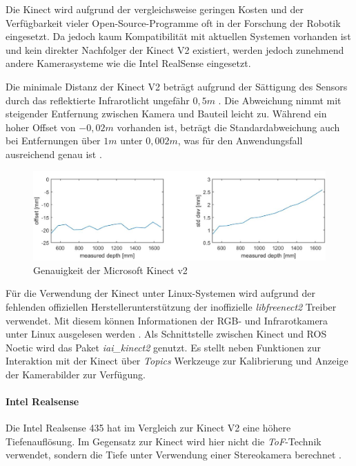 Die Kinect wird aufgrund der vergleichsweise geringen Kosten und der Verfügbarkeit vieler Open-Source-Programme oft in der Forschung der Robotik eingesetzt. Da jedoch kaum Kompatibilität mit aktuellen Systemen vorhanden ist und kein direkter Nachfolger der Kinect V2 existiert, werden jedoch zunehmend andere Kamerasysteme wie die Intel RealSense eingesetzt.

Die minimale Distanz der Kinect V2 beträgt aufgrund der Sättigung des Sensors durch das reflektierte Infrarotlicht ungefähr $0,5m$ \cite[Kapitel~2.1]{noonan_repurposing_2015}. Die Abweichung nimmt mit steigender Entfernung zwischen Kamera und Bauteil leicht zu. Während ein hoher Offset von $-0,02m$ vorhanden ist, beträgt die Standardabweichung auch bei Entfernungen über $1m$ unter $0,002m$, was für den Anwendungsfall ausreichend genau ist .

\begin{figure}[ht]
    \centering
    \includegraphics[width=\textwidth]{Bilder/kinect_genauigkeit.jpg}
    \caption{Genauigkeit der Microsoft Kinect v2 \cite[Abbildung~5]{chen_comparison_2017}}
    \label{fig:kinect_genauigkeit}
\end{figure}

Für die Verwendung der Kinect unter Linux-Systemen wird aufgrund der fehlenden offiziellen Herstellerunterstützung der inoffizielle \textit{libfreenect2} Treiber verwendet. Mit diesem können Informationen der RGB- und Infrarotkamera unter Linux ausgelesen werden \cite{xiang_libfreenect2_2016}.
Als Schnittstelle zwischen Kinect und \ac{ROS} Noetic wird das Paket \textit{iai\_kinect2} \cite{wiedemeyer_iai_2021} genutzt. Es stellt neben Funktionen zur Interaktion mit der Kinect über \textit{Topics} Werkzeuge zur Kalibrierung und Anzeige der Kamerabilder zur Verfügung.

\pagebreak
\paragraph{Intel Realsense} \label{subsec:intel_realsense}

Die Intel Realsense 435 hat im Vergleich zur Kinect V2 eine höhere Tiefenauflösung. Im Gegensatz zur Kinect wird hier nicht die \textit{\ac{ToF}}-Technik verwendet, sondern die Tiefe unter Verwendung einer Stereokamera berechnet . 

